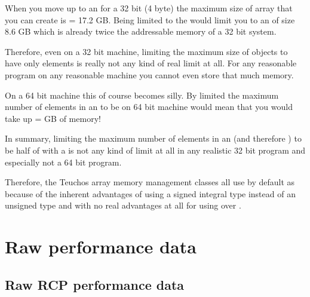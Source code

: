 \documentclass[pdf,ps2pdf,11pt]{SANDreport}
\begin{document}
When you move up to an {} for a 32 bit (4 byte)
{} the maximum size of array that you can create is
{} = 17.2 GB.  Being limited to the
{} {} would limit you to an
{} of size 8.6 GB which is already twice the
addressable memory of a 32 bit system.

Therefore, even on a 32 bit machine, limiting the maximum size of
{} objects to have only
{} elements is really
not any kind of real limit at all.  For any reasonable program on any
reasonable machine you cannot even store that much memory.

On a 64 bit machine this of course becomes silly.  By limited the
maximum number of elements in an {} to be
{} on 64 bit machine
would mean that you would take up {} = {} GB of memory!

In summary, limiting the maximum number of elements in an
{} (and therefore {}) to be half
of {} with a {} {} is
not any kind of limit at all in any realistic 32 bit program and
especially not a 64 bit program.

Therefore, the Teuchos array memory management classes all use by
default {} as {} because of the
inherent advantages of using a signed integral type instead of an
unsigned type and with no real advantages at all for using
{} over {}.


%
{}\section{Raw performance data}
\label{apdx:raw-perf-data}
%

%
{}\subsection{Raw RCP performance data}
\label{apdx:raw-rcp-perf-data}
%
\end{document}
